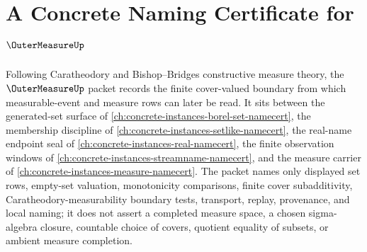\chapter{A Concrete Naming Certificate for $\OuterMeasureUp$}
\label{ch:concrete-instances-outer-measure-namecert}

Following Caratheodory and Bishop--Bridges constructive measure theory, the $\OuterMeasureUp$ packet records the finite cover-valued boundary from which measurable-event and measure rows can later be read. It sits between the generated-set surface of \autoref{ch:concrete-instances-borel-set-namecert}, the membership discipline of \autoref{ch:concrete-instances-setlike-namecert}, the real-name endpoint seal of \autoref{ch:concrete-instances-real-namecert}, the finite observation windows of \autoref{ch:concrete-instances-streamname-namecert}, and the measure carrier of \autoref{ch:concrete-instances-measure-namecert}. The packet names only displayed set rows, empty-set valuation, monotonicity comparisons, finite cover subadditivity, Caratheodory-measurability boundary tests, transport, replay, provenance, and local naming; it does not assert a completed measure space, a chosen sigma-algebra closure, countable choice of covers, quotient equality of subsets, or ambient measure completion.

